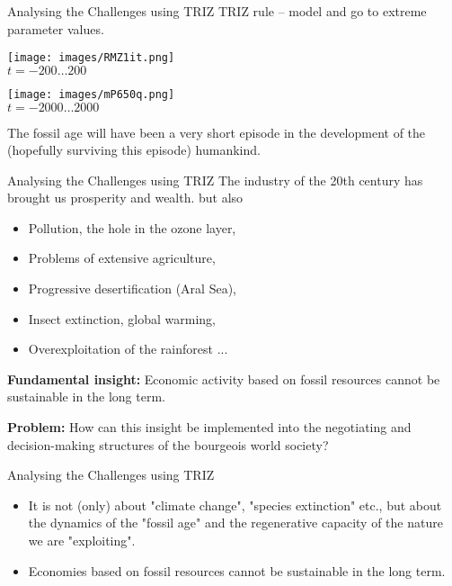 \documentclass{beamer}
\begin{document}
\begin{frame}{Analysing the Challenges using TRIZ}
  TRIZ rule -- model and go to extreme parameter values.
  \begin{center}
    \begin{minipage}{.45\textwidth}\centering
      \texttt{[image: images/RMZ1it.png]}\\
      $t=-200\ldots200$
    \end{minipage}    \hfill
    \begin{minipage}{.45\textwidth}\centering
    \texttt{[image: images/mP650q.png]}\\
    $t=-2000\ldots2000$
    \end{minipage}
  \end{center}
  The fossil age will have been a very short episode in the development of the
  (hopefully surviving this episode) humankind.
\end{frame}

\begin{frame}{Analysing the Challenges using TRIZ}
  The industry of the 20th century has brought us prosperity and wealth.  but
  also
\begin{itemize}
\item Pollution, the hole in the ozone layer,
\item Problems of extensive agriculture,
\item Progressive desertification (Aral Sea),
\item Insect extinction, global warming,
\item Overexploitation of the rainforest ...
\end{itemize}

\textbf{Fundamental insight:} Economic activity based on fossil resources
cannot be sustainable in the long term.

\textbf{Problem:} How can this insight be implemented into the negotiating and
decision-making structures of the bourgeois world society?
\end{frame}

\begin{frame}{Analysing the Challenges using TRIZ}
  \begin{itemize}
  \item It is not (only) about "climate change", "species extinction" etc.,
    but about the dynamics of the "fossil age" and the regenerative capacity
    of the nature we are "exploiting".
  \item Economies based on fossil resources cannot be sustainable in the
    long term.  
  \end{itemize}
\end{frame}
\end{document}
